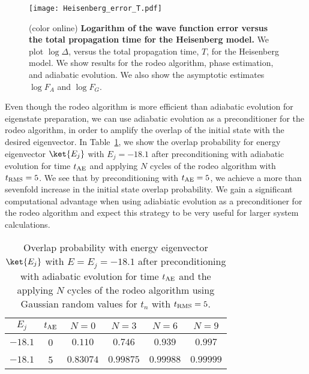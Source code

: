 \begin{figure}
\centering
\texttt{[image: Heisenberg\_error\_T.pdf]}
\caption{(color online) {\bf Logarithm of the wave function error versus the total propagation time for the Heisenberg model.} We plot $\log \Delta$, versus the total propagation time, $T$, for the Heisenberg model. We show results for the rodeo algorithm, phase estimation, and adiabatic evolution.  We also show the asymptotic estimates $\log F_A$ and $\log F_G$.}
\label{Heisenberg_error_T}
\end{figure} 

Even though the rodeo algorithm is more efficient than adiabatic evolution for eigenstate preparation, we can use adiabatic evolution as a preconditioner for the rodeo algorithm, in order to amplify the overlap of the initial state with the desired eigenvector.  In Table~\ref{overlap}, we show the overlap probability for energy eigenvector $\ket{E_j}$ with $E_{j}=-18.1$ after preconditioning with adiabatic evolution for time $t_{\rm AE}$ and applying $N$ cycles of the rodeo algorithm with $t_{\rm RMS} = 5$.  We see that by preconditioning with $t_{\rm AE}=5$, we achieve a more than sevenfold increase in the initial state overlap probability.  We gain a significant computational advantage when using adiabiatic evolution as a preconditioner for the rodeo algorithm and expect this strategy to be very useful for larger system calculations.
\begin{table}[h]
\begin{center}
\caption{Overlap probability with energy eigenvector $\ket{E_j}$ with $E=E_{j}=-18.1$ after preconditioning with adiabatic evolution for time $t_{\rm AE}$ and the applying $N$ cycles of the rodeo algorithm using Gaussian random values for $t_n$ with $t_{\rm RMS} = 5$.\\}
\label{overlap}
\begin{tabular}{|c|c|c|c|c|c|}
\hline
$E_j$ & $t_{\rm AE}$ & $N=0$ & $N = 3$ & $N = 6$ & $N= 9$ \\
\hline
$ -18.1 $ & 0 & $  0.110 $ & $  0.746 $ & $  0.939 $ & $  0.997  $ \\
$ -18.1 $ & 5 & $  0.83074 $ & $ 0.99875 $ & $  0.99988 $ & $  0.99999  $ \\
\hline
\end{tabular}
\end{center}
\end{table}


